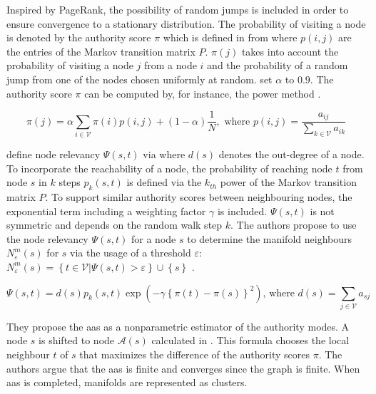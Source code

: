 Inspired by PageRank, the possibility of random jumps is included in order to ensure convergence to a stationary distribution. 
The probability of visiting a node is denoted by the authority score $\pi$ 
which is defined in  from \citet{mode_seeking_2012} 
where $p(i,j)$ are the entries of the Markov transition matrix $P$.
$\pi(j)$ takes into account the probability of visiting a node $j$ from a node $i$ and 
the probability of a random jump from one of the nodes chosen uniformly at random.
\citet{mode_seeking_2012} set $\alpha$ to $0.9$. 
The authority score $\pi$ can be computed by, for instance, the power method \citet{mode_seeking_2012,PageRank_2004}.

\begin{equation}
    \pi(j) = \alpha \sum_{i \in \mathcal{V}}^{}  \pi(i)p(i,j) + (1-\alpha)\frac{1}{N} , \text{ where } p(i,j) = \frac{a_{ij} }{\sum_{k \in \mathcal{V}}^{}a_{ik} } 
    \label{eq:authority_score}
\end{equation}

\citet{mode_seeking_2012} define node relevancy $\Psi(s,t)$ via  where $d(s)$ denotes the out-degree of a node.
To incorporate the reachability of a node, the probability of reaching node $t$ from node $s$ in $k$ steps $p_k(s,t)$ is 
defined via the $k_{th}$ power of the Markov transition matrix $P$.
To support similar authority scores between neighbouring nodes, the exponential term including a weighting factor $\gamma$ is included.
$\Psi(s,t)$ is not symmetric and depends on the random walk step $k$.
The authors propose to use the node relevancy $\Psi(s,t)$ for a node $s$ to determine the manifold neighbours $N_\varepsilon^m(s)$ for $s$ 
via the usage of a threshold $\varepsilon$: 
$N_\varepsilon^m(s) =  \left\{ t \in \mathcal{V} | \Psi(s,t) > \varepsilon \right\} \cup \left\{ s \right\}$ \citet{mode_seeking_2012}.

\begin{equation}
    \Psi(s,t) = d(s) p_k(s,t) \exp(-\gamma \left\{  \pi(t) - \pi(s)  \right\}^2)\text{, where } d(s) = \sum_{j\in \mathcal{V}}^{}a_{sj}
    \label{eq:node_relevancy}
\end{equation}

They propose the \ac{aas} as a nonparametric estimator of the authority modes.
A node $s$ is shifted to node $\mathcal{A}(s)$ calculated in . 
This formula chooses the local neighbour $t$ of $s$ that maximizes the difference of the authority scores $\pi$.
The authors argue that the \ac{aas} is finite and converges since the graph is finite.
When \ac{aas} is completed, manifolds are represented as clusters.


